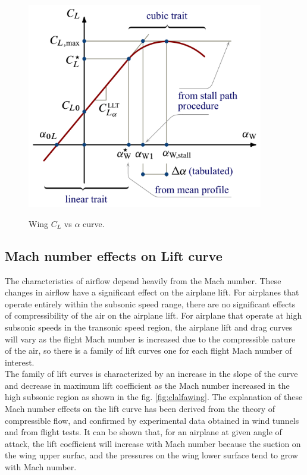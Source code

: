 \begin{figure}[H]
\centering
{\includegraphics[height=9cm]{Immagini/Wing_CL_Vs_alpha_curve.pdf}} 
\caption{Wing $C_L$ vs $\alpha$ curve.}
\label{fig:clalfa}
\end{figure}



\subsection{Mach number effects on Lift curve }
The characteristics of airflow depend heavily from the Mach number. These changes in airflow have a significant effect on the airplane lift. For airplanes that operate entirely within the subsonic speed range, there are no significant effects of compressibility of the air on the airplane lift. For airplane that operate at high subsonic speeds in the transonic speed region, the airplane lift and drag curves will vary as the flight Mach number is increased due to the compressible nature of the air, so there is a family of lift curves one for each flight Mach number of interest.\\
The family of lift curves is characterized by an increase in the slope of the curve and decrease in maximum lift coefficient as the Mach number increased in the high subsonic region as shown in the fig. \ref{fig:clalfawing}.
The explanation of these Mach number effects on the lift curve has been derived from the theory of compressible flow, and confirmed by experimental data obtained in wind tunnels and from flight tests. It can be shown that, for an airplane at given angle of attack, the lift coefficient will increase with Mach number because the suction on the wing upper surfac, and the pressures on the wing lower surface tend to grow with Mach number.  \cite{manual}

